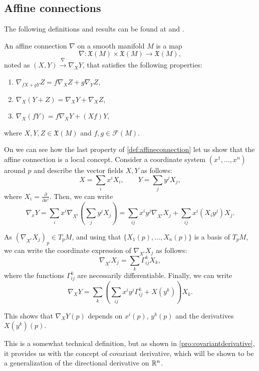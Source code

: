 \subsection{Affine connections}

The following definitions and results can be found at \cite[Ch. 2, Section 2]{docarmo79} and \cite[pp. 59-67]{oneill83}.

\begin{definition}
	\label{def:affineconnection}
	An affine connection $\nabla$ on a smooth manifold $M$ is a map
	\[
		\nabla \colon \mathfrak{X}(M) \times \mathfrak{X}(M) \to \mathfrak{X}(M),
	\]
	noted as $(X, Y) \xrightarrow{\nabla}\nabla_X Y$, that satisfies the following properties:
	\begin{enumerate}
		\item $\nabla_{fX + gY} Z = f\nabla_X Z + g\nabla_Y Z$,
		\item $\nabla_X(Y+Z) = \nabla_X Y + \nabla_X Z$,
		\item $\nabla_X (fY) = f\nabla_XY + (Xf) Y$,
	\end{enumerate}
	where $X,Y,Z \in \mathfrak{X}(M)$ and $f,g \in \mathcal{F}(M)$.
\end{definition}

On \cite[Chapter 2, Remark 2.3]{docarmo79} we can see how the last property of \autoref{def:affineconnection} let us show that the affine connection is a local concept. Consider a coordinate system $(x^1, \dots, x^n)$ around $p$ and describe the vector fields $X, Y$ as follows:
\[
X = \sum_i x^i X_i, \qquad Y = \sum_j y^j X_j,
\]
where $X_i = \frac{\partial}{\partial x^i}$. Then, we can write
\[
\nabla_x Y = \sum_i x^i \nabla_{X^i}\left(\sum_j y^j X_j \right) = \sum_{ij} x^i y^j \nabla_{X^i} X_j + \sum_{ij} x^i (X_i y^j) X_j.
\]

As $(\nabla_{X^i} X_j)_p \in T_p M$, and using that $\{X_1(p), \dots, X_n(p)\}$ is a basis of $T_p M$, we can write the coordinate expression of $\nabla_{X^i} X_j$ as follows:
\[
	\nabla_{X^i} X_j = \sum_k \Gamma^k_{ij} X_k,
\]
where the functions $\Gamma^k_{ij}$ are necessarily differentiable. Finally, we can write
\[
\nabla_X Y = \sum_k \left( \sum_{ij} x^i y^j \Gamma^k_{ij} + X(y^k) \right) X_k.
\]

This shows that $\nabla_X Y(p)$ depends on $x^i(p)$, $y^k(p)$ and the derivatives $X(y^k)(p)$.

This is a somewhat technical definition, but as shown in \autoref{pro:covariantderivative}, it provides us with the concept of covariant derivative, which will be shown to be a generalization of the directional derivative on $\mathbb{R}^n$.


